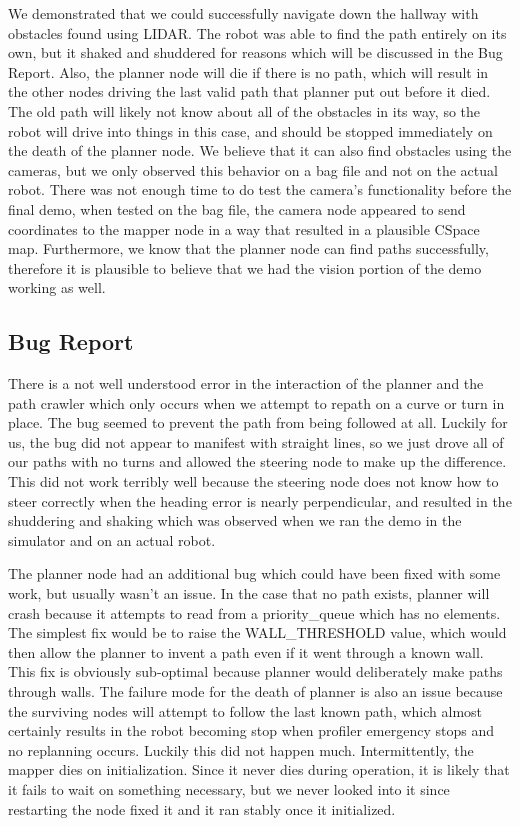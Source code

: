 \documentclass{article}
\begin{document}
We demonstrated that we could successfully navigate down the hallway with obstacles found using LIDAR.  
The robot was able to find the path entirely on its own, but it shaked and shuddered for reasons which will be discussed in the Bug Report.
Also, the planner node will die if there is no path, which will result in the other nodes driving the last valid path that planner put out before it died.  
The old path will likely not know about all of the obstacles in its way, so the robot will drive into things in this case, and should be stopped immediately on the death of the planner node.
We believe that it can also find obstacles using the cameras, but we only observed this behavior on a bag file and not on the actual robot.
There was not enough time to do test the camera's functionality before the final demo, when tested on the bag file, the camera node appeared to send coordinates to the mapper node in a way that resulted in a plausible CSpace map.
Furthermore, we know that the planner node can find paths successfully, therefore it is plausible to believe that we had the vision portion of the demo working as well.


\subsection{Bug Report}

There is a not well understood error in the interaction of the planner and the path crawler which only occurs when we attempt to repath on a curve or turn in place. 
The bug seemed to prevent the path from being followed at all.
Luckily for us, the bug did not appear to manifest with straight lines, so we just drove all of our paths with no turns and allowed the steering node to make up the difference.
This did not work terribly well because the steering node does not know how to steer correctly when the heading error is nearly perpendicular, and resulted in the shuddering and shaking which was observed when we ran the demo in the simulator and on an actual robot.

The planner node had an additional bug which could have been fixed with some work, but usually wasn't an issue.  
In the case that no path exists, planner will crash because it attempts to read from a priority_queue which has no elements.
The simplest fix would be to raise the WALL_THRESHOLD value, which would then allow the planner to invent a path even if it went through a known wall.  
This fix is obviously sub-optimal because planner would deliberately make paths through walls.
The failure mode for the death of planner is also an issue because the surviving nodes will attempt to follow the last known path, which almost certainly results in the robot becoming stop when profiler emergency stops and no replanning occurs.  Luckily this did not happen much.
Intermittently, the mapper dies on initialization.  Since it never dies during operation, it is likely that it fails to wait on something necessary, but we never looked into it since restarting the node fixed it and it ran stably once it initialized.
\end{document}

